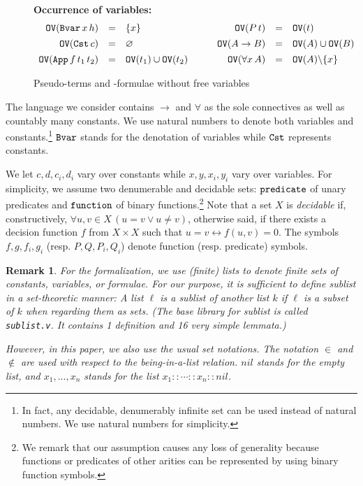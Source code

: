\documentclass{svjour3}                     %
\newtheorem{rem}[thm]{Remark}
\newcommand{\bs}{\backslash}
\newcommand{\sing}[1]{\{ #1 \}}
\newcommand{\tApp}{\textup{\tt App}}
\newcommand{\tBvar}{\textup{\tt Bvar}}
\newcommand{\tCst}{\textup{\tt Cst}}
\newcommand{\tFvar}{\textup{\tt Fvar}}
\newcommand{\tfunction}{\textup{\tt function}}
\newcommand{\tpredicate}{\textup{\tt predicate}}
\newcommand{\tPH}{\textup{\tt OV}}
\begin{document}
\begin{figure}[t]
\textbf{Occurrence of variables:}
\[
\begin{array}{rcl}
  \tPH(\tBvar\, x\, h) & = & \sing{x}\\[1ex]
  \tPH(\tCst\, c) & = & \varnothing\\[1ex]
  \tPH(\tApp\, f\, t_1\, t_2) & = & \tPH(t_1) \cup \tPH(t_2)
\end{array} \qquad
\begin{array}{rcl}
  \tPH(P\, t) & = & \tPH(t)\\[1ex]
  \tPH(A \to B) & = & \tPH(A) \cup \tPH(B)\\[1ex]
  \tPH(\forall x\, A) & = & \tPH(A) \bs \sing{x}
\end{array}
\] 
\hrulefill
\caption{Pseudo-terms and -formulae without free variables}
  \label{fig:pseudo}
\end{figure}

The language we consider contains $\to$ and $\forall$ as the sole
connectives as well as countably many constants. We use natural numbers
to denote both variables and constants.\footnote{In fact, any decidable,
  denumerably infinite set can be used instead of natural numbers.
  We use natural
  numbers for simplicity.} $\tBvar$ stands for the denotation of
variables while $\tCst$ represents constants. 

We let $c, d, c_i, d_i$ vary over constants while $x, y, x_i, y_i$ vary over variables. For simplicity, we assume two denumerable and decidable sets: $\tpredicate$ of unary predicates and $\tfunction$ of binary functions.\footnote{We remark that our assumption causes any loss of generality because functions or predicates of other arities can be represented by using binary function symbols.} Note that a set $X$ is {\em decidable} if, constructively, $\forall u, v \in X \, (u=v \lor u\neq v)$, otherwise said, if there exists a decision function $f$ from $X \times X$ such that $u=v \leftrightarrow f(u,v)=0$. The symbols $f,g, f_i, g_i$ (resp. $P, Q, P_i, Q_i$) denote function (resp. predicate) symbols.

\begin{rem}
For the formalization, we use (finite) lists to denote finite sets of
constants, variables, or formulae. For our purpose, it is sufficient to
define \textit{sublist} in a set-theoretic manner: A list $\ell$ is a
sublist of another list $k$ if $\ell$ is a subset of $k$ when regarding them as sets. (The base library for sublist is called \verb|sublist.v|. It contains 1 definition and 16 very simple lemmata.)

However, in this paper, we also use the usual set notations. 
The notation $\in$ and $\not\in$ are used with respect to the
{\em being-in-a-list} relation. $nil$ stands for the empty list,
and $x_1, ..., x_n$ stands for the list $x_1 :: \cdots :: x_n :: nil$.
\end{rem}
\end{document}
